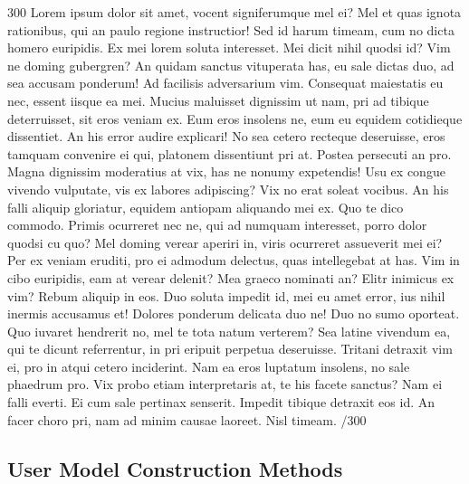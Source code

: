 \documentclass{sigchi}
\begin{document}
300 Lorem ipsum dolor sit amet, vocent signiferumque mel ei? Mel et quas ignota rationibus, qui an paulo regione instructior! Sed id harum timeam, cum no dicta homero euripidis. Ex mei lorem soluta interesset. Mei dicit nihil quodsi id? Vim ne doming gubergren? An quidam sanctus vituperata has, eu sale dictas duo, ad sea accusam ponderum! Ad facilisis adversarium vim. Consequat maiestatis eu nec, essent iisque ea mei. Mucius maluisset dignissim ut nam, pri ad tibique deterruisset, sit eros veniam ex. Eum eros insolens ne, eum eu equidem cotidieque dissentiet. An his error audire explicari! No sea cetero recteque deseruisse, eros tamquam convenire ei qui, platonem dissentiunt pri at. Postea persecuti an pro. Magna dignissim moderatius at vix, has ne nonumy expetendis! Usu ex congue vivendo vulputate, vis ex labores adipiscing? Vix no erat soleat vocibus. An his falli aliquip gloriatur, equidem antiopam aliquando mei ex. Quo te dico commodo. Primis ocurreret nec ne, qui ad numquam interesset, porro dolor quodsi cu quo? Mel doming verear aperiri in, viris ocurreret assueverit mei ei? Per ex veniam eruditi, pro ei admodum delectus, quas intellegebat at has. Vim in cibo euripidis, eam at verear delenit? Mea graeco nominati an? Elitr inimicus ex vim? Rebum aliquip in eos. Duo soluta impedit id, mei eu amet error, ius nihil inermis accusamus et! Dolores ponderum delicata duo ne! Duo no sumo oporteat. Quo iuvaret hendrerit no, mel te tota natum verterem? Sea latine vivendum ea, qui te dicunt referrentur, in pri eripuit perpetua deseruisse. Tritani detraxit vim ei, pro in atqui cetero inciderint. Nam ea eros luptatum insolens, no sale phaedrum pro. Vix probo etiam interpretaris at, te his facete sanctus? Nam ei falli everti. Ei cum sale pertinax senserit. Impedit tibique detraxit eos id. An facer choro pri, nam ad minim causae laoreet. Nisl timeam. /300

\subsection{User Model Construction Methods}
\end{document}
